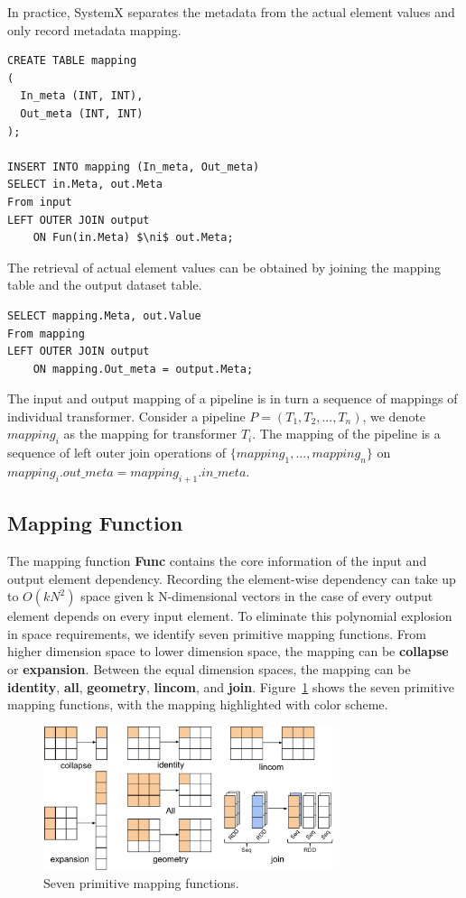 \documentclass{sig-alternate}
\begin{document}
In practice, SystemX separates the metadata from the actual element values and only record metadata mapping.
\begin{lstlisting}
CREATE TABLE mapping
(
  In_meta (INT, INT),
  Out_meta (INT, INT)
);

INSERT INTO mapping (In_meta, Out_meta)
SELECT in.Meta, out.Meta
From input
LEFT OUTER JOIN output 
    ON Fun(in.Meta) $\ni$ out.Meta;
\end{lstlisting}
The retrieval of actual element values can be obtained by joining the mapping table and the output dataset table.
\begin{lstlisting}
SELECT mapping.Meta, out.Value
From mapping
LEFT OUTER JOIN output 
    ON mapping.Out_meta = output.Meta;
\end{lstlisting}

The input and output mapping of a pipeline is in turn a sequence of mappings of individual transformer.
Consider a pipeline $P=(T_1, T_2, ..., T_n)$, we denote $mapping_i$ as the mapping for transformer $T_i$.
The mapping of the pipeline is a sequence of left outer join operations of $\{mapping_1, ..., mapping_n\}$ on 
$mapping_i.out\_meta = mapping_{i+1}.in\_meta$.

\subsection{Mapping Function}
\label{sec:Map-Func}
The mapping function {\bf Func} contains the core information of the input and output element dependency.
Recording the element-wise dependency can take up to $O(kN^2)$ space given k N-dimensional vectors in the case
of every output element depends on every input element. 
To eliminate this polynomial explosion in space requirements, we identify seven primitive mapping functions.
From higher dimension space to lower dimension space, the mapping can be {\bf collapse} or {\bf expansion}.
Between the equal dimension spaces, the mapping can be {\bf identity}, {\bf all}, {\bf geometry}, {\bf lincom}, and {\bf join}.
Figure~\ref{fig:narrowmapping} shows the seven primitive mapping functions, with the mapping highlighted with color scheme.

\begin{figure}[t]
\begin{center}
    \includegraphics[width=85mm]{pictures/narrowmapping}
\caption {Seven primitive mapping functions.
    \label{fig:narrowmapping}
}
\end{center}
\end{figure}
\end{document}
